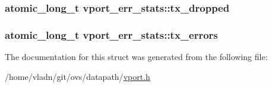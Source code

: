 \subsubsection[{tx\+\_\+dropped}]{\setlength{\rightskip}{0pt plus 5cm}atomic\+\_\+long\+\_\+t vport\+\_\+err\+\_\+stats\+::tx\+\_\+dropped}\label{structvport__err__stats_a299aaacfac0fe9d48ddd000674b7816a}
\hypertarget{structvport__err__stats_a24478cbc4a61b5454a4247830bf2c7b4}{}
\subsubsection[{tx\+\_\+errors}]{\setlength{\rightskip}{0pt plus 5cm}atomic\+\_\+long\+\_\+t vport\+\_\+err\+\_\+stats\+::tx\+\_\+errors}\label{structvport__err__stats_a24478cbc4a61b5454a4247830bf2c7b4}


The documentation for this struct was generated from the following file\+:\begin{DoxyCompactItemize}
\item 
/home/vladn/git/ovs/datapath/\hyperlink{vport_8h}{vport.\+h}\end{DoxyCompactItemize}
